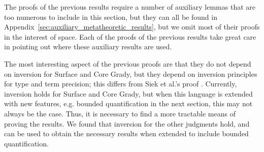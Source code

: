 The proofs of the previous results require a number of auxiliary
lemmas that are too numerous to include in this section, but they can
all be found in Appendix~\ref{sec:auxiliary_metatheoretic_results},
but we omit most of their proofs in the interest of space.  Each of
the proofs of the previous results take great care in pointing out
where these auxiliary results are used.

The most interesting aspect of the previous proofs are that they do
not depend on inversion for Surface and Core Grady, but they depend on
inversion principles for type and term precision; this differs from
Siek et al.'s proof \cite{Siek:2015}. Currently, inversion holds for
Surface and Core Grady, but when this language is extended with new
features, e.g. bounded quantification in the next section, this may
not always be the case.  Thus, it is necessary to find a more
tractable means of proving the results.  We found that inversion for
the other judgments hold, and can be used to obtain the necessary
results when extended to include bounded quantification.


